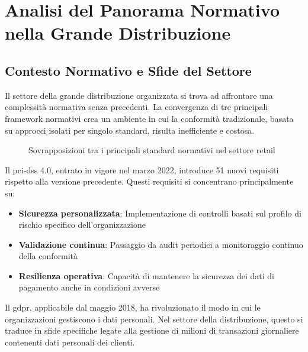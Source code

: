 \section{Analisi del Panorama Normativo nella Grande Distribuzione}
\label{sec:4.2_panorama_normativo}

\subsection{Contesto Normativo e Sfide del Settore}
\label{subsec:4.2.1_contesto}

Il settore della grande distribuzione organizzata si trova ad affrontare una complessità normativa senza precedenti. La convergenza di tre principali framework normativi crea un ambiente in cui la conformità tradizionale, basata su approcci isolati per singolo standard, risulta inefficiente e costosa.

\begin{figure}[h]
\centering
\caption{Sovrapposizioni tra i principali standard normativi nel settore retail}
\label{fig:normative_overlap}
\end{figure}

Il \gls{pci-dss} 4.0, entrato in vigore nel marzo 2022, introduce 51 nuovi requisiti rispetto alla versione precedente\autocite{pcidss2024}. Questi requisiti si concentrano principalmente su:

\begin{itemize}
    \item \textbf{Sicurezza personalizzata}: Implementazione di controlli basati sul profilo di rischio specifico dell'organizzazione
    \item \textbf{Validazione continua}: Passaggio da audit periodici a monitoraggio continuo della conformità
    \item \textbf{Resilienza operativa}: Capacità di mantenere la sicurezza dei dati di pagamento anche in condizioni avverse
\end{itemize}

Il \gls{gdpr}, applicabile dal maggio 2018, ha rivoluzionato il modo in cui le organizzazioni gestiscono i dati personali. Nel settore della distribuzione, questo si traduce in sfide specifiche legate alla gestione di milioni di transazioni giornaliere contenenti dati personali dei clienti.

